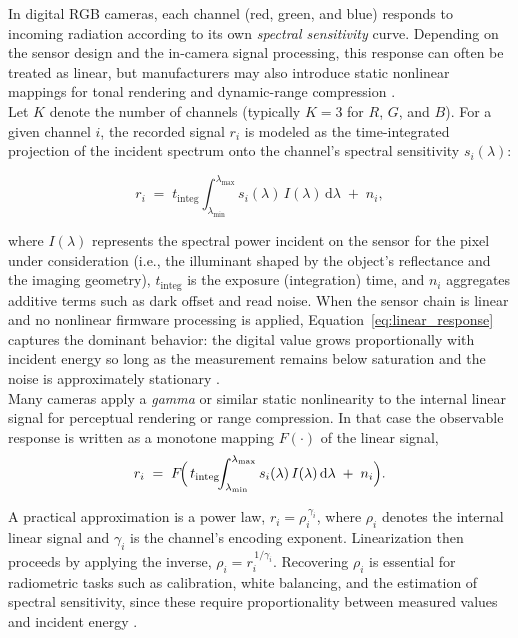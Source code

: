 \noindent
In digital RGB cameras, each channel (red, green, and blue) responds to incoming radiation according to its own \emph{spectral sensitivity} curve. Depending on the sensor design and the in-camera signal processing, this response can often be treated as linear, but manufacturers may also introduce static nonlinear mappings for tonal rendering and dynamic-range compression \cite{Vora1997DigitalModels,Cheung2004AccurateCameras,Uttner2006SpectralCameras}.\\


\noindent
Let \(K\) denote the number of channels (typically \(K=3\) for \(R\), \(G\), and \(B\)). For a given channel \(i\), the recorded signal \(r_i\) is modeled as the time-integrated projection of the incident spectrum onto the channel’s spectral sensitivity \(s_i(\lambda)\):

\begin{equation}
r_{i} \;=\; t_{\mathrm{integ}} \int_{\lambda_{\min}}^{\lambda_{\max}} s_{i}(\lambda)\,I(\lambda)\,\mathrm{d}\lambda \;+\; n_{i},
\label{eq:linear_response}
\end{equation}

\noindent
where \(I(\lambda)\) represents the spectral power incident on the sensor for the pixel under consideration (i.e., the illuminant shaped by the object's reflectance and the imaging geometry), \(t_{\mathrm{integ}}\) is the exposure (integration) time, and \(n_i\) aggregates additive terms such as dark offset and read noise. When the sensor chain is linear and no nonlinear firmware processing is applied, Equation~\eqref{eq:linear_response} captures the dominant behavior: the digital value grows proportionally with incident energy so long as the measurement remains below saturation and the noise is approximately stationary \cite{Vora1997DigitalModels}.\\

\noindent
Many cameras apply a \emph{gamma} or similar static nonlinearity to the internal linear signal for perceptual rendering or range compression. In that case the observable response is written as a monotone mapping \(F(\cdot)\) of the linear signal,
\begin{equation}
r_{i} \;=\; F\!\Bigl(\,t_{\mathrm{integ}}\!\!\int_{\lambda_{\min}}^{\lambda_{\max}} s_{i}(\lambda)\,I(\lambda)\,\mathrm{d}\lambda \;+\; n_{i}\Bigr).
\label{eq:nonlinear_response}
\end{equation}

\noindent
A practical approximation is a power law, \(r_i = \rho_i^{\,\gamma_i}\), where \(\rho_i\) denotes the internal linear signal and \(\gamma_i\) is the channel’s encoding exponent. Linearization then proceeds by applying the inverse, \(\rho_i = r_i^{\,1/\gamma_i}\). Recovering \(\rho_i\) is essential for radiometric tasks such as calibration, white balancing, and the estimation of spectral sensitivity, since these require proportionality between measured values and incident energy \cite{Cheung2004AccurateCameras,Uttner2006SpectralCameras}.\\


